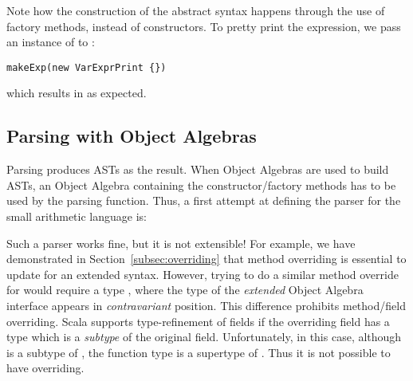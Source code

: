 
Note how the construction of the abstract syntax happens through
the use of factory methods, instead of constructors.
To pretty print the expression,
we pass an instance of  to :

\begin{lstlisting}
makeExp(new VarExprPrint {})
\end{lstlisting}
which results in  as expected.

\subsection{Parsing with Object Algebras}\label{subsec:parsingwithoa}

Parsing produces ASTs as the result. When Object Algebras are used
to build ASTs, an Object Algebra containing the constructor/factory
methods has to be used by the parsing function. Thus, a first attempt
at defining the parser for the small arithmetic language is:

\begin{comment}
\inlinecode{ExprAlg} is defined for a small language using Object Algebras. Since Object Algebras represent ``objects'' implicitly as functions like \inlinecode{ExprAlg[E] =>} \inlinecode{E} for abstract \inlinecode{E}, we first try to build the corresponding parser by type \inlinecode{ExprAlg[E] =>} \inlinecode{Parser[E]}.
\end{comment}

Such a parser works fine, but it is not extensible! For example, we have demonstrated in Section~\ref{subsec:overriding} that method overriding is essential to update  for an extended syntax. However, trying to do a similar method override for  would require a type  , where the type of the \emph{extended} Object Algebra interface appears in \emph{contravariant} position. This difference prohibits method/field overriding. Scala supports type-refinement of fields if the overriding
field has a type which is a \emph{subtype} of the original field.
Unfortunately, in this case, although  is a subtype
of , the function type   is a supertype of  . Thus it is not possible to have overriding.

